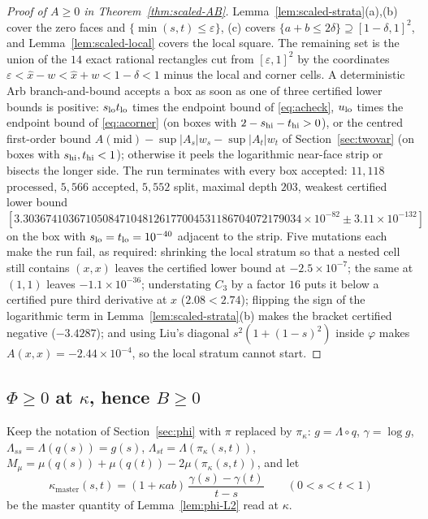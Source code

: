 \documentclass[11pt]{article}
\theoremstyle{plain}
\theoremstyle{definition}
\theoremstyle{remark}
\begin{document}
\begin{proof}[Proof of $A\ge0$ in Theorem~\ref{thm:scaled-AB}]
Lemma~\ref{lem:scaled-strata}(a),(b) cover the zero faces and
$\{\min(s,t)\le\varepsilon\}$, (c) covers $\{a+b\le2\delta\}\supseteq[1-\delta,1]^2$,
and Lemma~\ref{lem:scaled-local} covers the local square.  The remaining set
is the union of the $14$ exact rational rectangles cut from $[\varepsilon,1]^2$
by the coordinates $\varepsilon<\hat x-w<\hat x+w<1-\delta<1$ minus the local
and corner cells.  A deterministic Arb branch-and-bound accepts a box as soon
as one of three certified lower bounds is positive: $s_{\rm lo}t_{\rm lo}$
times the endpoint bound of \eqref{eq:acheck}, $u_{\rm lo}$ times the
endpoint bound of \eqref{eq:acorner} (on boxes with $2-s_{\rm hi}-t_{\rm hi}>0$),
or the centred first-order bound
$A(\mathrm{mid})-\sup|A_s|w_s-\sup|A_t|w_t$ of Section~\ref{sec:twovar} (on
boxes with $s_{\rm hi},t_{\rm hi}<1$); otherwise it peels the logarithmic
near-face strip or bisects the longer side.  The run terminates with every
box accepted: $11{,}118$ processed, $5{,}566$ accepted, $5{,}552$ split,
maximal depth $203$, weakest certified lower bound
$[3.3036741036710508471048126177004531186704072179034\times10^{-82}
\pm3.11\times10^{-132}]$ on the
box with $s_{\rm lo}=t_{\rm lo}=10^{-40}$ adjacent to the strip.  Five
mutations each make the run fail, as required: shrinking the local stratum so
that a nested cell still contains $(x,x)$ leaves the certified lower bound at
$-2.5\times10^{-7}$; the same at $(1,1)$ leaves $-1.1\times10^{-36}$;
understating $C_3$ by a factor $16$ puts it below a certified pure third
derivative at $x$ ($2.08<2.74$); flipping the sign of the logarithmic term in
Lemma~\ref{lem:scaled-strata}(b) makes the bracket certified negative
($-3.4287$); and using Liu's diagonal $s^2(1+(1-s)^2)$ inside $\varphi$ makes
$A(x,x)=-2.44\times10^{-4}$, so the local stratum cannot start.
\end{proof}

\subsection{\texorpdfstring{$\Phi\ge0$}{Phi>=0} at \texorpdfstring{$\kappa$}{kappa}, hence \texorpdfstring{$B\ge0$}{B>=0}}

Keep the notation of Section~\ref{sec:phi} with $\pi$ replaced by $\pi_\kappa$:
$g=\Lambda\circ q$, $\gamma=\log g$, $\Lambda_{ss}=\Lambda(q(s))=g(s)$,
$\Lambda_{st}=\Lambda(\pi_\kappa(s,t))$,
$M_\mu=\mu(q(s))+\mu(q(t))-2\mu(\pi_\kappa(s,t))$, and let
\[
  \kappa_{\mathrm{master}}(s,t)=(1+\kappa ab)\,\frac{\gamma(s)-\gamma(t)}{t-s}\qquad(0<s<t<1)
\]
be the master quantity of Lemma~\ref{lem:phi-L2} read at $\kappa$.
\end{document}
